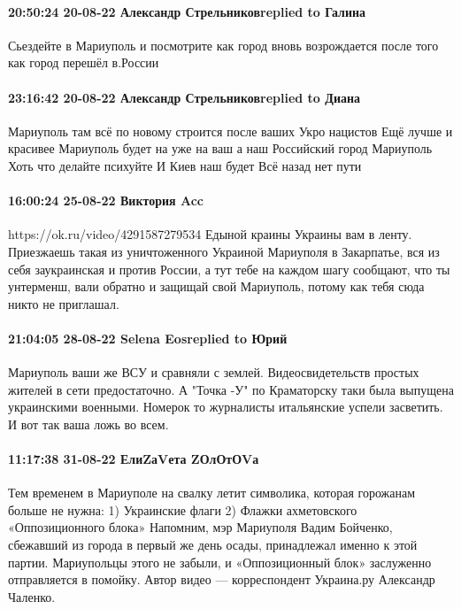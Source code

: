 \paragraph{20:50:24 20-08-22 Александр Стрельниковreplied to Галина}

Сьездейте в Мариуполь и посмотрите как город вновь возрождается после того как
город перешёл в.России

\paragraph{23:16:42 20-08-22 Александр Стрельниковreplied to Диана}

Мариуполь там всё по новому строится после ваших Укро нацистов Ещё лучше и
красивее Мариуполь будет на уже на ваш а наш Российский город Мариуполь Хоть
что делайте психуйте И Киев наш будет Всё назад нет пути

\paragraph{16:00:24 25-08-22 Виктория Acc}

https://ok.ru/video/4291587279534 Едыной краины Украины вам в ленту.
Приезжаешь такая из уничтоженного Украиной Мариуполя в Закарпатье, вся из себя заукраинская и против России, а тут тебе на каждом шагу сообщают, что ты унтерменш, вали обратно и защищай свой Мариуполь, потому как тебя сюда никто не приглашал.

\paragraph{21:04:05 28-08-22 Selena Eosreplied to Юрий}

Мариуполь ваши же ВСУ и сравняли с землей. Видеосвидетельств простых жителей в сети предостаточно. 
А "Точка -У" по Краматорску таки была выпущена украинскими военными. Номерок то журналисты итальянские успели засветить. И вот так ваша ложь во всем.

\paragraph{11:17:38 31-08-22 ЕлиZаVета ZОлОтОVа}

Тем временем в Мариуполе на свалку летит символика, которая горожанам больше не нужна:
1) Украинские флаги
2) Флажки ахметовского «Оппозиционного блока»
Напомним, мэр Мариуполя Вадим Бойченко, сбежавший из города в первый же день осады, принадлежал именно к этой партии.
Мариупольцы этого не забыли, и «Оппозиционный блок» заслуженно отправляется в помойку.
Автор видео — корреспондент Украина.ру Александр Чаленко.


